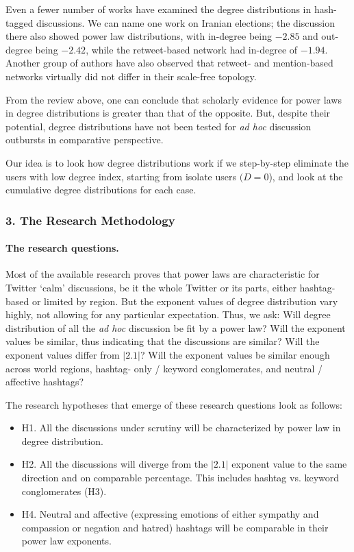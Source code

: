 Even a fewer number of works have examined the degree distributions in hash- tagged discussions. We can name one work \cite{ZhouBandariKong} on Iranian elections; the discussion there also showed power law distributions, with in-degree being \(-2.85\) and out-degree being \(-2.42\), while the retweet-based network had in-degree of \(-1.94\). Another group of authors \cite{ConoverRatkiewiczFrancisco} have also observed that retweet- and mention-based networks virtually did not differ in their scale-free topology.

From the review above, one can conclude that scholarly evidence for power laws in degree distributions is greater than that of the opposite. But, despite their potential, degree distributions have not been tested for \textit{ad hoc} discussion outbursts in comparative perspective.

Our idea is to look how degree distributions work if we step-by-step eliminate the users with low degree index, starting from isolate users \((D = 0\)), and look at the cumulative degree distributions for each case.

\subsubsection{3. The Research Methodology}

\paragraph{The research questions.} Most of the available research proves that power laws are characteristic for Twitter ‘calm’ discussions, be it the whole Twitter or its parts, either hashtag-based or limited by region. But the exponent values of degree distribution vary highly, not allowing for any particular expectation. Thus, we ask: Will degree distribution of all the \textit{ad hoc} discussion be fit by a power law? Will the exponent values be similar, thus indicating that the discussions are similar? Will the exponent values differ from \(\lvert2.1\rvert\)? Will the exponent values be similar enough across world regions, hashtag- only / keyword conglomerates, and neutral / affective hashtags?

The research hypotheses that emerge of these research questions look as follows:

\begin{itemize}
	\item H1. All the discussions under scrutiny will be characterized by power law in degree distribution.
	
	\item H2. All the discussions will diverge from the \(\lvert2.1\rvert\) exponent value to the same direction and on comparable percentage. This includes hashtag vs. keyword conglomerates (H3).
	
	\item H4. Neutral and affective (expressing emotions of either sympathy and compassion or negation and hatred) hashtags will be comparable in their power law exponents.
\end{itemize}

